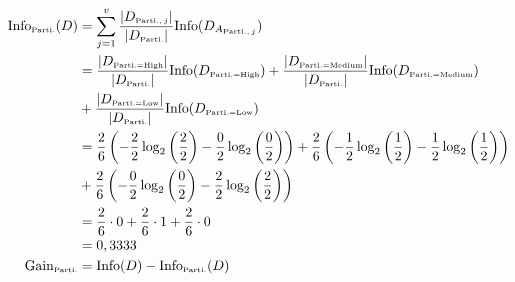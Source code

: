 \documentclass[
english,
smallborders
]{i6prcsht}
\newcommand{\OfSpecificValue}[3]{_{\text{\tiny #1#2#3}}}
\newcommand{\OfAttribute}[1]{_{\text{\tiny #1}}}
\begin{document}
\begin{solution}
\begin{enumerate}
\begin{enumerate}
\begin{enumerate}
				                  \begin{alignat*}{3}
					                  \text{Info}\OfAttribute{Parti.}(D) & = \sum_{j=1}^v \frac{|D\OfAttribute{Parti.$,j$}|}{|D\OfAttribute{Parti.}|} \text{Info}(D_{A\OfAttribute{Parti.$,j$}})                                                                                                                             \\
					                                                     & = \frac{|D\OfSpecificValue{Parti.}{=}{High}|}{|D\OfAttribute{Parti.}|} \text{Info}(D\OfSpecificValue{Parti.}{=}{High}) + \frac{|D\OfSpecificValue{Parti.}{=}{Medium}|}{|D\OfAttribute{Parti.}|} \text{Info}(D\OfSpecificValue{Parti.}{=}{Medium}) \\
					                                                     & + \frac{|D\OfSpecificValue{Parti.}{=}{Low}|}{|D\OfAttribute{Parti.}|} \text{Info}(D\OfSpecificValue{Parti.}{=}{Low})                                                                                                                              \\
					                                                     & = \frac{2}{6} \left(-\frac{2}{2} \log_2\left(\frac{2}{2}\right) - \frac{0}{2} \log_2\left(\frac{0}{2}\right)\right) + \frac{2}{6} \left(-\frac{1}{2} \log_2\left(\frac{1}{2}\right) - \frac{1}{2} \log_2\left(\frac{1}{2}\right)\right)           \\
					                                                     & + \frac{2}{6} \left(-\frac{0}{2} \log_2\left(\frac{0}{2}\right) - \frac{2}{2} \log_2\left(\frac{2}{2}\right)\right)                                                                                                                               \\
					                                                     & = \frac{2}{6} \cdot 0 + \frac{2}{6} \cdot 1 + \frac{2}{6} \cdot 0                                                                                                                                                                                 \\
					                                                     & =  0,3333                                                                                                                                                                                                                                         \\
					                  \text{Gain}\OfAttribute{Parti.}    & = \text{Info}(D) - \text{Info}\OfAttribute{Parti.}(D)                                                                                                                                                                                             \\

\end{alignat*}
\end{enumerate}
\end{enumerate}
\end{enumerate}
\end{solution}
\end{document}

